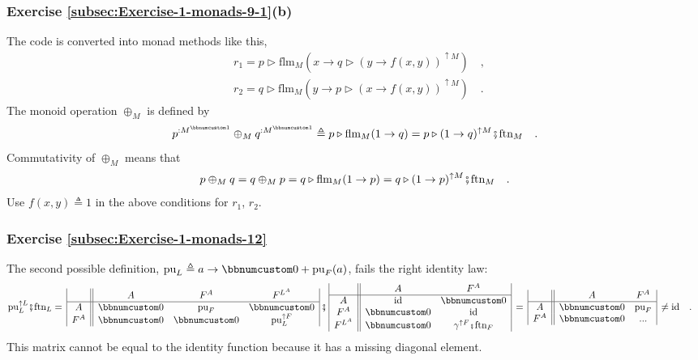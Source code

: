 \subsubsection*{Exercise \ref{subsec:Exercise-1-monads-9-1}(b)}

The code is converted into monad methods like this,
\begin{align*}
 & r_{1}=p\triangleright\text{flm}_{M}(x\rightarrow q\triangleright(y\rightarrow f(x,y))^{\uparrow M})\quad,\\
 & r_{2}=q\triangleright\text{flm}_{M}(y\rightarrow p\triangleright(x\rightarrow f(x,y))^{\uparrow M})\quad.
\end{align*}
The monoid operation $\oplus_{M}$ is defined by
\[
p^{:M^{\bbnum 1}}\oplus_{M}q^{:M^{\bbnum 1}}\triangleq p\triangleright\text{flm}_{M}(1\rightarrow q)=p\triangleright(1\rightarrow q)^{\uparrow M}\bef\text{ftn}_{M}\quad.
\]
Commutativity of $\oplus_{M}$ means that
\[
p\oplus_{M}q=q\oplus_{M}p=q\triangleright\text{flm}_{M}(1\rightarrow p)=q\triangleright(1\rightarrow p)^{\uparrow M}\bef\text{ftn}_{M}\quad.
\]
Use $f(x,y)\triangleq1$ in the above conditions for $r_{1}$, $r_{2}$.

\subsubsection*{Exercise \ref{subsec:Exercise-1-monads-12}}

The second possible definition, $\text{pu}_{L}\triangleq a\rightarrow\bbnum 0+\text{pu}_{F}(a)$,
fails the right identity law:
\begin{align*}
 & \text{pu}_{L}^{\uparrow L}\bef\text{ftn}_{L}=\,\begin{array}{|c||ccc|}
 & A & F^{A} & F^{L^{A}}\\
\hline A & \bbnum 0 & \text{pu}_{F} & \bbnum 0\\
F^{A} & \bbnum 0 & \bbnum 0 & \text{pu}_{L}^{\uparrow F}
\end{array}\,\bef\,\begin{array}{|c||cc|}
 & A & F^{A}\\
\hline A & \text{id} & \bbnum 0\\
F^{A} & \bbnum 0 & \text{id}\\
F^{L^{A}} & \bbnum 0 & \gamma^{\uparrow F}\bef\text{ftn}_{F}
\end{array}\,=\,\begin{array}{|c||cc|}
 & A & F^{A}\\
\hline A & \bbnum 0 & \text{pu}_{F}\\
F^{A} & \bbnum 0 & ...
\end{array}\,\neq\text{id}\quad.
\end{align*}
This matrix cannot be equal to the identity function because it has
a missing diagonal element.

